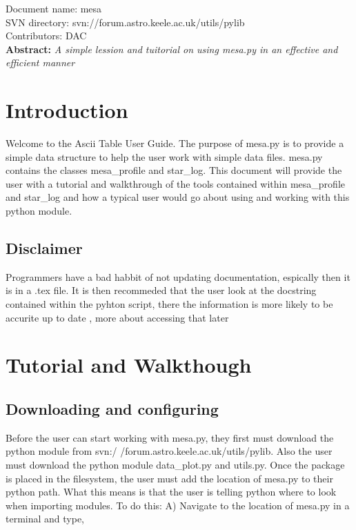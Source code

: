 \renewcommand{\ndoctitle}{mesa.py: Mesa Data Structure} 
\renewcommand{\ndocname}{mesa}                      
\renewcommand{\svndir}{svn://forum.astro.keele.ac.uk/utils/pylib}  
\renewcommand{\ndoccontribs}{DAC}



Document name: \ndocname \\
SVN directory: \svndir\\
Contributors: \ndoccontribs\\



{  \textbf{Abstract:} \slshape
A simple lession and tuitorial on using mesa.py in an effective and efficient manner
}

\section{Introduction}
Welcome to the Ascii Table User Guide.  The purpose of mesa.py is
to provide a simple data structure to help the user work with simple data files. 
mesa.py contains the classes mesa\_profile and star\_log.
This document will provide the user with a 
tutorial and walkthrough of the tools contained within mesa\_profile and star\_log and
how a typical user would go about using and working with this python module.
\subsection{Disclaimer}
Programmers have a bad habbit of not updating documentation, espically then it is in  a .tex file.
It is then recommeded that the user look at the docstring contained within the pyhton script, there the information is more likely to be accurite up to date
, more about accessing that later
\section{Tutorial and Walkthough}

\subsection{Downloading and configuring}
Before the user can start working with mesa.py, they first must download the python 
module from svn:/ /forum.astro.keele.ac.uk/utils/pylib.  Also the user must download the python module data\_plot.py and utils.py. Once the package is placed in the filesystem, the user must add the location
of mesa.py to their python path.  What this means is that the user is telling python where to look when importing modules.
To do this:
\newline
A) Navigate to the location of mesa.py in a terminal and type,

